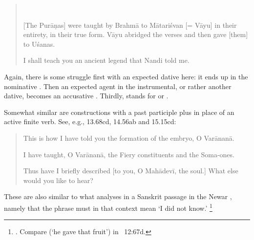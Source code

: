 \begin{quote}
\\

        [The Purāṇas] were taught by Brahmā to 
        Mātariśvan [= Vāyu] in their entirety, in their true form.
        Vāyu abridged the verses and then gave [them] to Uśanas.
        

        I shall teach you an ancient legend that Nandi told me.
\end{quote}

\noindent
Again, there is some struggle first with an expected dative here:
it ends up in the nominative . Then an expected 
agent in the instrumental, or rather another dative, 
becomes an accusative . Thirdly,
 stands for  or
. 

Somewhat similar are constructions with a 
past participle plus 
in place of an active finite verb. See, e.g.,
13.68cd, 14.56ab and 15.15cd:

\begin{quote}

            This is how I have told you the formation of 
            the embryo, O Varānanā.
            

			I have taught, O Varānanā, the Fiery constituents 
			and the Soma-ones.
			

		Thus have I briefly described [to you, O Mahādevī, the soul.] 
		What else would you like to hear?
\end{quote}

\noindent
These are also similar to what \citeauthor{JorgensenVicitra}
analyses in a Sanskrit passage in the Newar
, namely that
the phrase  must in that context 
mean `I did not know.'%
		\footnote{.
						Compare  (`he gave that fruit') in \VSS\ 12:67d.}


